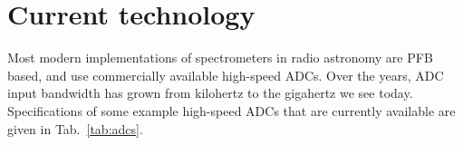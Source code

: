 \documentclass{ws-rv961x669}
\begin{document}






\section{Current technology}

Most modern implementations of spectrometers in radio astronomy are PFB based, and use commercially available high-speed ADCs. Over the years, ADC input bandwidth has grown from kilohertz to the gigahertz we see today. Specifications of some example high-speed ADCs that are currently available are given in Tab.~\ref{tab:adcs}. 
\end{document}
